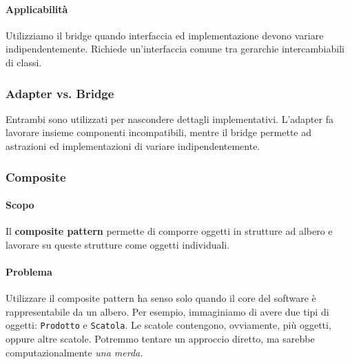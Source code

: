 \documentclass[11pt]{article}
\newcommand{\code}[1]{\texttt{#1}}
\begin{document}
\paragraph{Applicabilità}
Utilizziamo il bridge quando interfaccia ed implementazione devono variare indipendentemente. Richiede un'interfaccia comune tra gerarchie intercambiabili di classi. 
\subsubsection{Adapter vs. Bridge}
Entrambi sono utilizzati per nascondere dettagli implementativi. L'adapter fa lavorare insieme componenti incompatibili, mentre il bridge permette ad astrazioni ed implementazioni di variare indipendentemente.
\subsubsection{Composite}
\paragraph{Scopo}
Il \textbf{composite pattern} permette di comporre oggetti in strutture ad albero e lavorare su queste strutture come oggetti individuali. 

\paragraph{Problema}
Utilizzare il composite pattern ha senso solo quando il core del software è rappresentabile da un albero. Per esempio, immaginiamo di avere due tipi di oggetti: \code{Prodotto} e \code{Scatola}. Le scatole contengono, ovviamente, più oggetti, oppure altre scatole. Potremmo tentare un approccio diretto, ma sarebbe computazionalmente \textit{una merda.}
\end{document}

